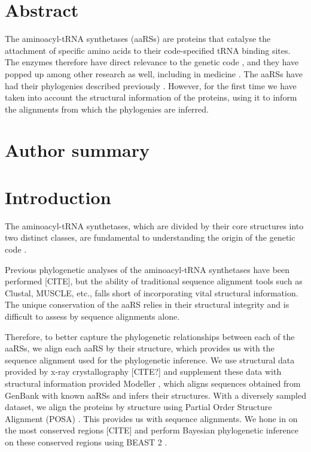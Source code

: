 \documentclass[10pt,letterpaper]{article}
\begin{document}
\section*{Abstract}
The aminoacyl-tRNA synthetases (aaRSs) are proteins that catalyse the attachment of specific amino acids to their code-specified tRNA binding sites.  The enzymes therefore have direct relevance to the genetic code \cite{bib10}, and they have popped up 
among other research as well, including in medicine \cite{bib9}.
The aaRSs have had their phylogenies described previously \cite{}.  However, for the first time we have taken into account the structural information of the proteins, using it to inform the alignments from which the phylogenies are inferred.

\section*{Author summary}

\linenumbers

\section*{Introduction}
The aminoacyl-tRNA synthetases, which are divided by their core structures into two distinct classes, are fundamental to understanding the origin of the genetic code \cite{bib10}.

Previous phylogenetic analyses of the aminoacyl-tRNA synthetases have been performed [CITE], but the ability of traditional sequence alignment tools such as Clustal, MUSCLE, etc., falls short of 
incorporating vital structural information.  The unique conservation of the aaRS relies in their structural integrity and is difficult to assess by sequence alignments alone.  

Therefore, to better capture the phylogenetic relationships between each of the aaRSs, we align each aaRS by their structure, which provides us with the sequence alignment used for the phylogenetic inference.  
We use structural data provided by x-ray crystallography [CITE?] and supplement these data with structural information provided Modeller \cite{bib1}, which aligns sequences obtained from GenBank with known aaRSs and infers their structures.
With a diversely sampled dataset, we align the proteins by structure using Partial Order Structure Alignment (POSA) \cite{bib6}.  This provides us with sequence alignments.  We hone in on the most conserved regions [CITE] and perform 
Bayesian phylogenetic inference on these conserved regions using BEAST 2 \cite{bib7}.
\end{document}
